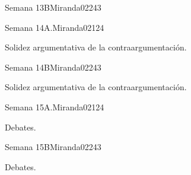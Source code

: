 \begin{syllabus}
\begin{unit}{Semana 13B}{Miranda02}{24}{3}
   \begin{unitgoals}
      \item 
      \item
      \item 
      \end{unitgoals}
\end{unit}

\begin{unit}{Semana 14A.}{Miranda02}{12}{4}
   \begin{topics}
      \item Solidez argumentativa de la contraargumentación. 
   \end{topics}
   \begin{unitgoals}
      \item 
   \end{unitgoals}
\end{unit}

\begin{unit}{Semana 14B}{Miranda02}{24}{3}
   \begin{topics}
      \item Solidez argumentativa de la contraargumentación.
   \end{topics}

   \begin{unitgoals}
      \item 
      \item
      \item 
      \end{unitgoals}
\end{unit}

\begin{unit}{Semana 15A.}{Miranda02}{12}{4}
   \begin{topics}
      \item Debates.
   \end{topics}
   \begin{unitgoals}
      \item 
   \end{unitgoals}
\end{unit}

\begin{unit}{Semana 15B}{Miranda02}{24}{3}
   \begin{topics}
      \item Debates.
   \end{topics}

   \begin{unitgoals}
      \item 
      \item
      \item 
      \end{unitgoals}
\end{unit}


\end{syllabus}
